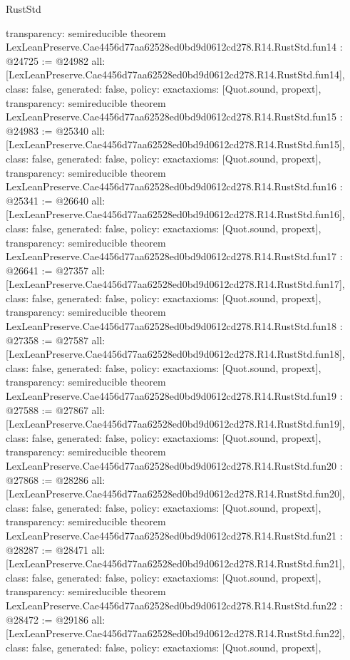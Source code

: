 \begin{lexlean}{RustStd}
\begin{coremodule}
{  transparency: semireducible
}
theorem LexLeanPreserve.Cae4456d77aa62528ed0bd9d0612cd278.R14.RustStd.fun14 : @24725 := @24982 {
  all: [LexLeanPreserve.Cae4456d77aa62528ed0bd9d0612cd278.R14.RustStd.fun14],
  class: false,
  generated: false,
  policy: exact{axioms: [Quot.sound, propext]},
  transparency: semireducible
}
theorem LexLeanPreserve.Cae4456d77aa62528ed0bd9d0612cd278.R14.RustStd.fun15 : @24983 := @25340 {
  all: [LexLeanPreserve.Cae4456d77aa62528ed0bd9d0612cd278.R14.RustStd.fun15],
  class: false,
  generated: false,
  policy: exact{axioms: [Quot.sound, propext]},
  transparency: semireducible
}
theorem LexLeanPreserve.Cae4456d77aa62528ed0bd9d0612cd278.R14.RustStd.fun16 : @25341 := @26640 {
  all: [LexLeanPreserve.Cae4456d77aa62528ed0bd9d0612cd278.R14.RustStd.fun16],
  class: false,
  generated: false,
  policy: exact{axioms: [Quot.sound, propext]},
  transparency: semireducible
}
theorem LexLeanPreserve.Cae4456d77aa62528ed0bd9d0612cd278.R14.RustStd.fun17 : @26641 := @27357 {
  all: [LexLeanPreserve.Cae4456d77aa62528ed0bd9d0612cd278.R14.RustStd.fun17],
  class: false,
  generated: false,
  policy: exact{axioms: [Quot.sound, propext]},
  transparency: semireducible
}
theorem LexLeanPreserve.Cae4456d77aa62528ed0bd9d0612cd278.R14.RustStd.fun18 : @27358 := @27587 {
  all: [LexLeanPreserve.Cae4456d77aa62528ed0bd9d0612cd278.R14.RustStd.fun18],
  class: false,
  generated: false,
  policy: exact{axioms: [Quot.sound, propext]},
  transparency: semireducible
}
theorem LexLeanPreserve.Cae4456d77aa62528ed0bd9d0612cd278.R14.RustStd.fun19 : @27588 := @27867 {
  all: [LexLeanPreserve.Cae4456d77aa62528ed0bd9d0612cd278.R14.RustStd.fun19],
  class: false,
  generated: false,
  policy: exact{axioms: [Quot.sound, propext]},
  transparency: semireducible
}
theorem LexLeanPreserve.Cae4456d77aa62528ed0bd9d0612cd278.R14.RustStd.fun20 : @27868 := @28286 {
  all: [LexLeanPreserve.Cae4456d77aa62528ed0bd9d0612cd278.R14.RustStd.fun20],
  class: false,
  generated: false,
  policy: exact{axioms: [Quot.sound, propext]},
  transparency: semireducible
}
theorem LexLeanPreserve.Cae4456d77aa62528ed0bd9d0612cd278.R14.RustStd.fun21 : @28287 := @28471 {
  all: [LexLeanPreserve.Cae4456d77aa62528ed0bd9d0612cd278.R14.RustStd.fun21],
  class: false,
  generated: false,
  policy: exact{axioms: [Quot.sound, propext]},
  transparency: semireducible
}
theorem LexLeanPreserve.Cae4456d77aa62528ed0bd9d0612cd278.R14.RustStd.fun22 : @28472 := @29186 {
  all: [LexLeanPreserve.Cae4456d77aa62528ed0bd9d0612cd278.R14.RustStd.fun22],
  class: false,
  generated: false,
  policy: exact{axioms: [Quot.sound, propext]},
}
\end{coremodule}
\end{lexlean}
